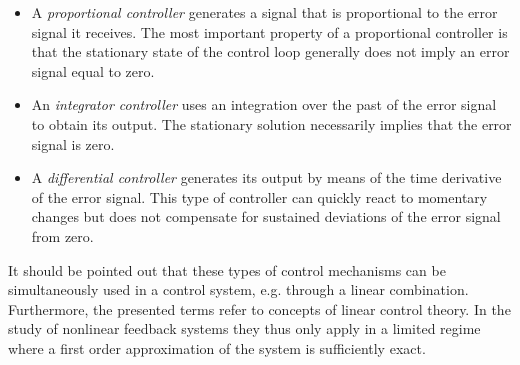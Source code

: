 \documentclass[10pt,a4paper]{article}
\begin{document}
\newpage
\begin{itemize}
\item A \textit{proportional controller} generates a signal that is proportional to the error signal it receives. The most important property of a proportional controller is that the stationary state of the control loop generally does not imply an error signal equal to zero.
\item An \textit{integrator controller} uses an integration over the past of the error signal to obtain its output. The stationary solution necessarily implies that the error signal is zero.
\item A \textit{differential controller} generates its output by means of the time derivative of the error signal. This type of controller can quickly react to momentary changes but does not compensate for sustained deviations of the error signal from zero.
\end{itemize}
It should be pointed out that these types of control mechanisms can be simultaneously used in a control system, e.g. through a linear combination. Furthermore, the presented terms refer to concepts of linear control theory. In the study of nonlinear feedback systems they thus only apply in a limited regime where a first order approximation of the system is sufficiently exact.
\end{document}
